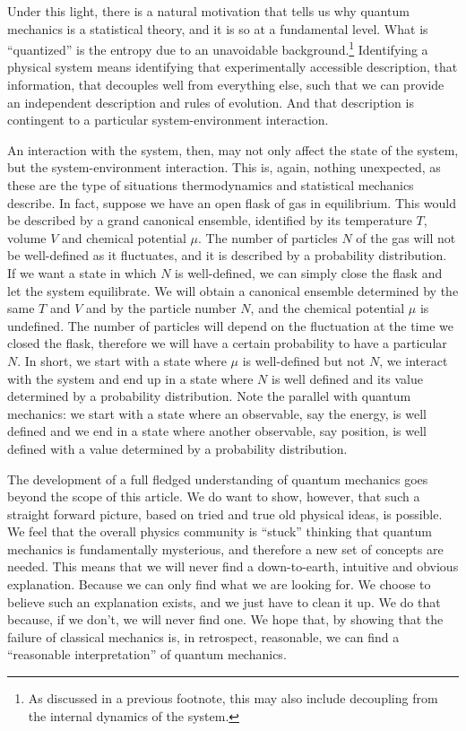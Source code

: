 \documentclass[10pt,twocolumn, nofootinbib]{revtex4-2}
\begin{document}
Under this light, there is a natural motivation that tells us why quantum mechanics is a statistical theory, and it is so at a fundamental level. What is ``quantized'' is the entropy due to an unavoidable background.\footnote{As discussed in a previous footnote, this may also include decoupling from the internal dynamics of the system.} Identifying a physical system means identifying that experimentally accessible description, that information, that decouples well from everything else, such that we can provide an independent description and rules of evolution. And that description is contingent to a particular system-environment interaction.

An interaction with the system, then, may not only affect the state of the system, but the system-environment interaction. This is, again, nothing unexpected, as these are the type of situations thermodynamics and statistical mechanics describe. In fact, suppose we have an open flask of gas in equilibrium. This would be described by a grand canonical ensemble, identified by its temperature $T$, volume $V$ and chemical potential $\mu$. The number of particles $N$ of the gas will not be well-defined as it fluctuates, and it is described by a probability distribution. If we want a state in which $N$ is well-defined, we can simply close the flask and let the system equilibrate. We will obtain a canonical ensemble determined by the same $T$ and $V$ and by the particle number $N$, and the chemical potential $\mu$ is undefined. The number of particles will depend on the fluctuation at the time we closed the flask, therefore we will have a certain probability to have a particular $N$. In short, we start with a state where $\mu$ is well-defined but not $N$, we interact with the system and end up in a state where $N$ is well defined and its value determined by a probability distribution. Note the parallel with quantum mechanics: we start with a state where an observable, say the energy, is well defined and we end in a state where another observable, say position, is well defined with a value determined by a probability distribution.

The development of a full fledged understanding of quantum mechanics goes beyond the scope of this article. We do want to show, however, that such a straight forward picture, based on tried and true old physical ideas, is possible. We feel that the overall physics community is ``stuck'' thinking that quantum mechanics is fundamentally mysterious, and therefore a new set of concepts are needed. This means that we will never find a down-to-earth, intuitive and obvious explanation. Because we can only find what we are looking for. We choose to believe such an explanation exists, and we just have to clean it up. We do that because, if we don't, we will never find one. We hope that, by showing that the failure of classical mechanics is, in retrospect, reasonable, we can find a ``reasonable interpretation'' of quantum mechanics.
\end{document}
